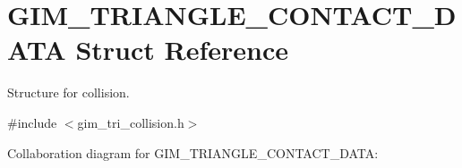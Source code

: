 \hypertarget{struct_g_i_m___t_r_i_a_n_g_l_e___c_o_n_t_a_c_t___d_a_t_a}{\section{G\+I\+M\+\_\+\+T\+R\+I\+A\+N\+G\+L\+E\+\_\+\+C\+O\+N\+T\+A\+C\+T\+\_\+\+D\+A\+T\+A Struct Reference}
\label{struct_g_i_m___t_r_i_a_n_g_l_e___c_o_n_t_a_c_t___d_a_t_a}
}


Structure for collision.  




{\ttfamily \#include $<$gim\+\_\+tri\+\_\+collision.\+h$>$}



Collaboration diagram for G\+I\+M\+\_\+\+T\+R\+I\+A\+N\+G\+L\+E\+\_\+\+C\+O\+N\+T\+A\+C\+T\+\_\+\+D\+A\+T\+A\+:
